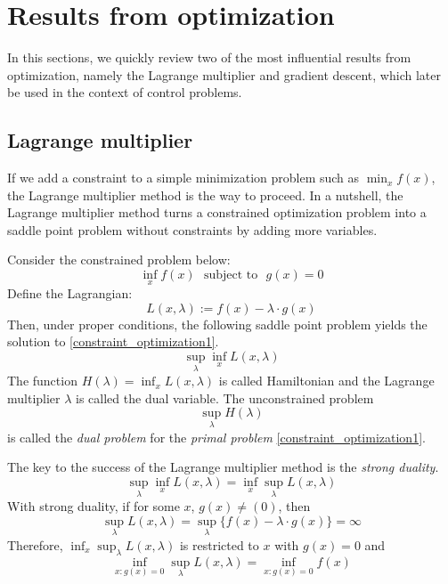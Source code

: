 \documentclass[11pt]{book}
\begin{document}
\appendix
\section{Results from optimization}
In this sections, we quickly review two of the most influential results from optimization, namely the Lagrange multiplier and gradient descent, which later be used in the context of control problems. 
\subsection{Lagrange multiplier}
If we add a constraint to a simple minimization problem such as $\min_x f(x)$, the Lagrange multiplier method is the way to proceed. In a nutshell, the Lagrange multiplier method turns a constrained optimization problem into a saddle point problem without constraints by adding more variables. 

Consider  the constrained problem below:
\begin{equation}        
\label{constraint_optimization1}
    \inf_x f(x) ~~~ \textrm{subject to}~~~g(x)=0
\end{equation}
Define the Lagrangian:
\begin{equation}\label{lagrangian}
    L(x,\lambda):= f(x) - \lambda \cdot g(x)
\end{equation}
Then, under proper conditions, the following saddle point problem yields the solution to \eqref{constraint_optimization1}.
\begin{equation}
\sup_{\lambda}\inf_{x}L(x,\lambda)
\end{equation}
The function $H(\lambda)=\inf_{x}L(x,\lambda)$ is called Hamiltonian and the Lagrange multiplier $\lambda$ is called the dual variable. The unconstrained problem
\begin{equation}\label{prob:dual}
    \sup_{\lambda}H(\lambda)
\end{equation}
is called the \emph{dual problem} for the \emph{primal problem} \eqref{constraint_optimization1}.

The key to the success of the Lagrange multiplier method is the \emph{strong duality}.
\begin{equation}
    \sup_{\lambda}\inf_{x} L(x,\lambda)=\inf_{x}\sup_{\lambda}L(x,\lambda)
\end{equation}
With strong duality, if for some $x$, $g(x)\neq(0)$, then 
\begin{equation}
    \sup_{\lambda}L(x,\lambda) = \sup_{\lambda}\{f(x) - \lambda \cdot g(x)\} = \infty
\end{equation}
Therefore, $\inf_{x}\sup_{\lambda}L(x,\lambda)$ is restricted to $x$ with $g(x)=0$ and 
\begin{equation}
    \inf_{x:g(x)=0} \sup_{\lambda}L(x,\lambda) = \inf_{x:g(x)=0} f(x)
\end{equation}
\end{document}
